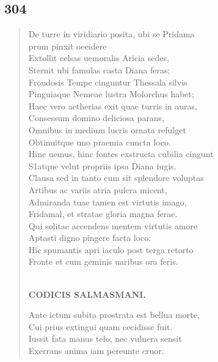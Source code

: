 \documentclass[11pt, a4paper]{report}
\begin{document}
            \subsection*{304}
      \begin{verse}
      De turre in viridiario posita, ubi se Pridama \\ prum pinxit oeeidere \\ Extollit celsas uemoralis Aricia sedes, \\ Sternit ubi famulas casta Diana feras; \\ Froudosis Tempe cinguntur Thessala silvis \\ Pinguiaque Nemeae lustra Molorchus habet; \\ Haec vero aetherias exit quae turris in auras, \\ Consessum domino deliciosa parans, \\ Omnibus in medium lucris ornata refulget \\ Obtinuitque uno praemia cuncta loco. \\ Hinc uemus, hinc fontes exstructa cubilia cingunt \\ S1atque velut propriis ipsa Diana iugis. \\ Clausa sed in tanto cum sit splendore voluptas \\ Artibus ac variis atria pulcra micent, \\ Admiranda tuae tamen est virtutis imago, \\ Fridamal, et stratae gloria magna ferae. \\ Qui solitae accendens mentem virtutis amore \\ Aptasti digno pingere facta loco: \\ Hic spumantis apri iaculo post terga retorto \\ Fronte et cum geminis uaribus ora feris. \\ 
        ﻿\pagebreak 
    \begin{center} \textbf{CODICIS SALMASMANI.} \end{center} \marginpar{[257]} Ante ictum subita prostrata est bellua morte, \\ Cui prius extingui quam cecidisse fuit. \\ Iussit fata manus telo, nec vulnera sensit \\ Exerrans anima iam pereunte cruor. \\ 
      \end{verse}
  
\end{document}
